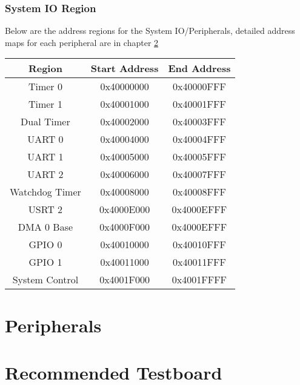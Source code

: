 \documentclass{report}
\begin{document}
\subsection{System IO Region}
Below are the address regions for the System IO/Peripherals, detailed address maps for each peripheral are in chapter \ref{peripherals}
\begin{center}
    \begin{tabular}{||c | c | c ||}
        \hline
        Region & Start Address & End Address \\ 
        \hline\hline
        Timer 0 & 0x40000000 & 0x40000FFF \\
        \hline
        Timer 1 & 0x40001000 & 0x40001FFF \\
        \hline
        Dual Timer & 0x40002000 & 0x40003FFF \\
        \hline
        UART 0 & 0x40004000 & 0x40004FFF \\
        \hline
        UART 1 & 0x40005000 & 0x40005FFF \\
        \hline
        UART 2 & 0x40006000 & 0x40007FFF \\
        \hline
        Watchdog Timer & 0x40008000 & 0x40008FFF \\
        \hline
        USRT 2  & 0x4000E000 & 0x4000EFFF \\
        \hline
        DMA 0 Base & 0x4000F000 & 0x4000EFFF \\
        \hline
        GPIO 0 & 0x40010000 & 0x40010FFF \\
        \hline
        GPIO 1 & 0x40011000 & 0x40011FFF \\
        \hline
        System Control & 0x4001F000 & 0x4001FFFF \\
        \hline
    \end{tabular}
\end{center}

\section{}


\chapter{Peripherals} \label{peripherals} 

\chapter{Recommended Testboard}
\end{document}
